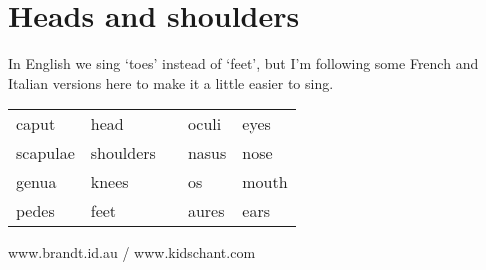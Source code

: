\documentclass[a5paper,12pt]{article}
\begin{document}
\autocompilegabc

\thispagestyle{empty}

\section*{Heads and shoulders}


\bigskip

In English we sing `toes' instead of `feet', but I'm following some French and Italian versions here to make it a little easier to sing.

\begin{table}[h]
\centering
\begin{tabular}{|l|l|l|l|l|}
\cline{1-2} \cline{4-5}
caput & head &  & oculi & eyes \\ \cline{1-2} \cline{4-5} 
scapulae & shoulders  &  & nasus & nose \\ \cline{1-2} \cline{4-5} 
genua & knees  &  & os & mouth \\ \cline{1-2} \cline{4-5} 
pedes & feet &  & aures & ears \\ \cline{1-2} \cline{4-5} 
\end{tabular}
\end{table}

\vfill

\begin{center}
www.brandt.id.au / www.kidschant.com
\end{center}

\eject
\end{document}
